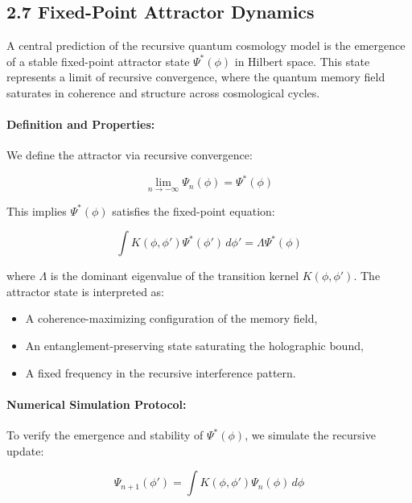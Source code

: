 \subsection*{2.7 Fixed-Point Attractor Dynamics}

A central prediction of the recursive quantum cosmology model is the emergence of a stable fixed-point attractor state \( \Psi^*(\phi) \) in Hilbert space. This state represents a limit of recursive convergence, where the quantum memory field saturates in coherence and structure across cosmological cycles.

\paragraph{Definition and Properties:}

We define the attractor via recursive convergence:

\begin{equation}
\lim_{n \to -\infty} \Psi_n(\phi) = \Psi^*(\phi)
\end{equation}

This implies \( \Psi^*(\phi) \) satisfies the fixed-point equation:

\begin{equation}
\int K(\phi, \phi') \Psi^*(\phi') \, d\phi' = \Lambda \Psi^*(\phi)
\end{equation}

\noindent
where \( \Lambda \) is the dominant eigenvalue of the transition kernel \( K(\phi, \phi') \). The attractor state is interpreted as:
\begin{itemize}
    \item A coherence-maximizing configuration of the memory field,
    \item An entanglement-preserving state saturating the holographic bound,
    \item A fixed frequency in the recursive interference pattern.
\end{itemize}

\paragraph{Numerical Simulation Protocol:}

To verify the emergence and stability of \( \Psi^*(\phi) \), we simulate the recursive update:

\begin{equation}
\Psi_{n+1}(\phi') = \int K(\phi, \phi') \Psi_n(\phi) \, d\phi
\end{equation}

